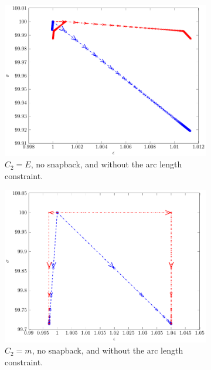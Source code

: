 \documentclass[10pt]{elsarticle}
\begin{document}
\begin{figure}[]
	\begin{subfigure}{0.45\textwidth}
		\centering
		\includegraphics[scale=0.7]{./conv_figs/bad_metric_no_snap.pdf}
		\caption{$C_2=E$, no snapback, and without the arc length constraint.}
		\label{bad_metric_no_snap}
	\end{subfigure}
	\hfill
	\begin{subfigure}{0.45\textwidth}
		\centering
		\includegraphics[scale=0.7]{./conv_figs/good_metric_no_snap.pdf}
		\caption{$C_2=m$, no snapback, and without the arc length constraint.}
		\label{good_metric_no_snap}
	\end{subfigure}
	\begin{subfigure}{0.45\textwidth}

\end{subfigure}
\end{figure}
\end{document}
